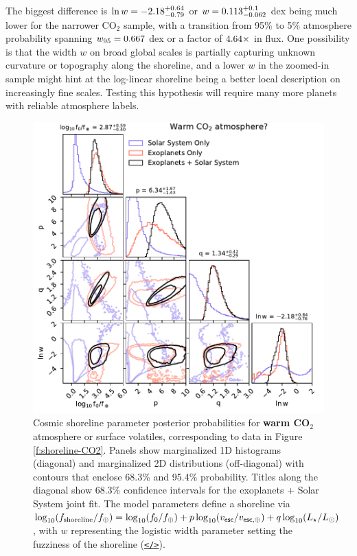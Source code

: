 \documentclass[modern,linenumbers,trackchanges]{aastex7}
\begin{document}
The biggest difference is $\ln w = -2.18_{-0.79}^{+0.64}$ or $w = 0.113_{-0.062}^{+0.1}$ dex being much lower for the narrower CO$_2$ sample, with a transition from 95\% to 5\% atmosphere probability spanning $w_{95} = 0.667$ dex or a factor of $4.64\times$ in flux. One possibility is that the width $w$ on broad global scales is partially capturing unknown curvature or topography along the shoreline, and a lower $w$ in the zoomed-in sample might hint at the log-linear shoreline being a better local description on increasingly fine scales. Testing this hypothesis will require many more planets with reliable atmosphere labels. 

\begin{figure}[ht!]
\includegraphics[width=\textwidth]{figures/posteriors-CO2.pdf}

\caption{Cosmic shoreline parameter posterior probabilities for {\bf warm CO$_2$} atmosphere or surface volatiles, corresponding to data in Figure \ref{f:shoreline-CO2}. Panels show marginalized 1D histograms (diagonal) and marginalized 2D distributions (off-diagonal) with contours that enclose 68.3\% and 95.4\% probability. Titles along the diagonal show 68.3\% confidence intervals for the exoplanets + Solar System joint fit. The model parameters define a shoreline via $\log_{10} (f_{\rm shoreline}/f_\oplus) = \log_{10} (f_{\sf 0}/f_\oplus) + p \log_{10} (v_{\sf esc}/v_{\sf esc, \oplus}) + q \log_{10} (L_\star/L_\odot)$, with $w$ representing the logistic width parameter setting the fuzziness of the shoreline (\href{https://github.com/zkbt/shoreline/blob/main/notebooks/print-and-visualize-posteriors.ipynb}{\texttt{</>}}).}
\label{f:posteriors-CO2}
\end{figure}
\end{document}
